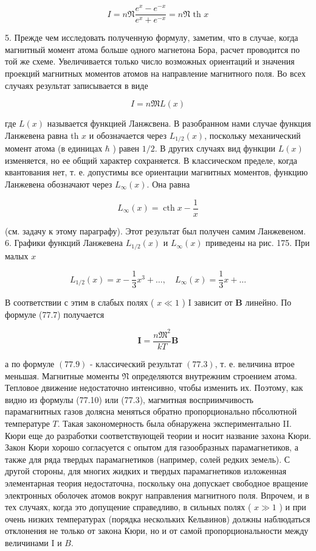 \documentclass[12pt]{article}
\begin{document}
  $$
  I=n \mathfrak{N} \frac{e^x-e^{-x}}{e^x+e^{-x}}=n \mathfrak{N} \text { th } x
  $$

  5. Прежде чем исследовать полученную формулу, заметим, что в случае, когда магнитный момент атома больше одного магнетона Бора, расчет проводится по той же схеме. Увеличивается только число возможных ориентаций и значения проекций магнитных моментов атомов на направление магнитного поля. Во всех случаях результат записывается в виде

  $$
  I=n \mathfrak{M} L(x)
  $$


  где $L(x)$ называется функцией Ланжсвена. В разобранном нами случае функция Ланжевена равна th $x$ и обозначается через $L_{1 / 2}(x)$, поскольку механический момент атома (в единицах $\hbar$ ) равен $1 / 2$. В других случаях вид функции $L(x)$ изменяется, но ее общий характер сохраняется. В классическом пределе, когда квантования нет, т. е. допустимы все ориентации магнитных моментов, функцию Ланжевена обозначают через $L_{\infty}(x)$. Она равна

  $$
  L_{\infty}(x)=\operatorname{cth} x-\frac{1}{x}
  $$

  (см. задачу к этому параграфу). Этот результат был получен самим Ланжевеном.
  6. Графики функций Ланжевена $L_{1 / 2}(x)$ и $L_{\infty}(x)$ приведены на рис. 175. При малых $x$

  $$
  L_{1 / 2}(x)=x-\frac{1}{3} x^3+\ldots, \quad L_{\infty}(x)=\frac{1}{3} x+\ldots
  $$


  В соответствии с этим в слабых полях ( $x \ll 1$ ) I зависит от $\mathbf{B}$ линейно. По формуле (77.7) получается

  $$
  \mathbf{I}=\frac{n \mathfrak{M}^2}{k T} \mathbf{B}
  $$

  а по формуле $(77.9)$ - классический результат $(77.3)$, т. е. величина втрое меньшая. Магнитные моменты $\mathfrak{N}$ определяются внутрежним строением атома. Тепловое движение недостаточно интенсивно, чтобы изменить их. Поэтому, как видно из формулы (77.10) или (77.3), магмитная восприимчивость парамагнитных газов долясна меняться обратно пропорционально пбсолютной температуре $T$. Такая закономерность была обнаружена экспериментально II. Кюри еще до разработки соответствующей теории и носит название захона Кюри. Закон Кюри хорошо согласуется с опытом для газообразных парамагнетиков, а также для ряда твердых парамагнетиков (например, солей редких земель). С другой стороны, для многих жидких и твердых парамагнетиков изложенная элементарная теория недостаточна, поскольку она допускает свободное вращение электронных оболочек атомов вокруг направления магнитного поля. Впрочем, и в тех случаях, когда это
  допущение справедливо, в сильных полях ( $x \gg 1$ ) и при очень низких температурах (порядка нескольких Кельвинов) должны наблюдаться отклонения не только от закона Кюри, но и от самой пропорциональности между величинами I и $B$.
\end{document}
